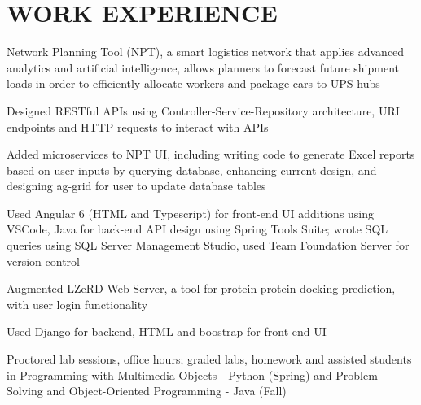 \documentclass[]{deedy-resume-openfont}
\begin{document}
\begin{minipage}[t]{0.67\textwidth} 


\section{WORK EXPERIENCE}

\vspace{\topsep} %
\begin{tightemize}
\item Network Planning Tool (NPT), a smart logistics network that applies advanced analytics and artificial intelligence, allows planners to forecast future shipment loads in order to efficiently allocate workers and package cars to UPS hubs
\item Designed RESTful APIs using Controller-Service-Repository architecture, URI endpoints and HTTP requests to interact with APIs
\item Added microservices to NPT UI, including writing code to generate Excel reports based on user inputs by querying database, enhancing current design, and designing ag-grid for user to update database tables
\item Used Angular 6 (HTML and Typescript) for front-end UI additions using VSCode, Java for back-end API design using Spring Tools Suite; wrote SQL queries using SQL Server Management Studio, used Team Foundation Server for version control
\end{tightemize}
\sectionsep

\begin{tightemize}
\item Augmented LZeRD Web Server, a tool for protein-protein docking prediction, with user login functionality
\item Used Django for backend, HTML and boostrap for front-end UI
\end{tightemize}
\sectionsep

\begin{tightemize}
\item Proctored lab sessions, office hours; graded labs, homework and assisted students in Programming with Multimedia Objects - Python (Spring) and Problem Solving and Object-Oriented Programming - Java (Fall)
\end{tightemize}
\sectionsep


\end{minipage}
\end{document}
